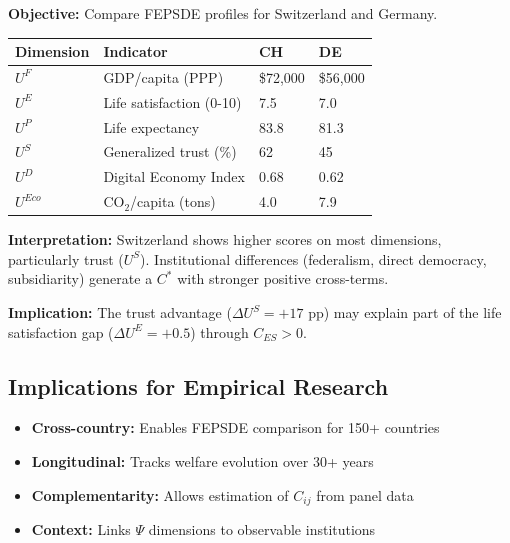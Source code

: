 \begin{tcolorbox}[colback=blue!5!white, colframe=blue!75!black,
    title=\textbf{Worked Example: Cross-Country Comparison}]

\textbf{Objective:} Compare FEPSDE profiles for Switzerland and Germany.

\begin{center}
\renewcommand{\arraystretch}{1.2}
\begin{tabular}{llll}
\hline
\textbf{Dimension} & \textbf{Indicator} & \textbf{CH} & \textbf{DE} \\
\hline
$U^F$ & GDP/capita (PPP) & \$72,000 & \$56,000 \\
$U^E$ & Life satisfaction (0-10) & 7.5 & 7.0 \\
$U^P$ & Life expectancy & 83.8 & 81.3 \\
$U^S$ & Generalized trust (\%) & 62 & 45 \\
$U^D$ & Digital Economy Index & 0.68 & 0.62 \\
$U^{Eco}$ & CO$_2$/capita (tons) & 4.0 & 7.9 \\
\hline
\end{tabular}
\end{center}

\textbf{Interpretation:}
Switzerland shows higher scores on most dimensions, particularly trust ($U^S$).
Institutional differences (federalism, direct democracy, subsidiarity)
generate a $C^*$ with stronger positive cross-terms.

\textbf{Implication:}
The trust advantage ($\Delta U^S = +17$ pp) may explain part of the
life satisfaction gap ($\Delta U^E = +0.5$) through $C_{ES} > 0$.

\end{tcolorbox}


\subsection{Implications for Empirical Research}
\label{sec:E-implications}

\begin{itemize}[nosep]
    \item \textbf{Cross-country:} Enables FEPSDE comparison for 150+ countries
    \item \textbf{Longitudinal:} Tracks welfare evolution over 30+ years
    \item \textbf{Complementarity:} Allows estimation of $C_{ij}$ from panel data
    \item \textbf{Context:} Links $\Psi$ dimensions to observable institutions
\end{itemize}

